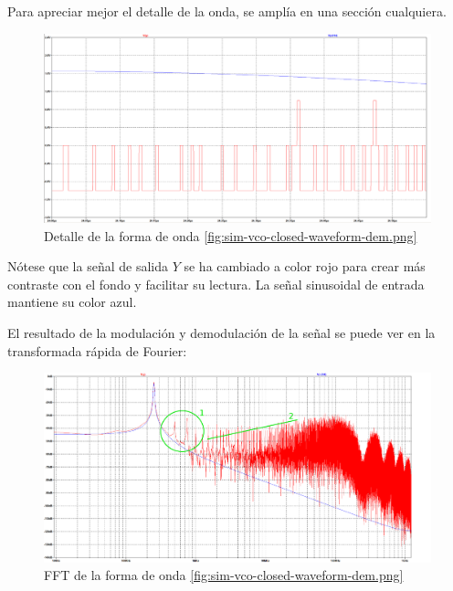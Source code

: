 \documentclass[12pt]{report} %
\begin{document}
	Para apreciar mejor el detalle de la onda, se amplía en una sección cualquiera.
	
	\begin{figure}[H]
		\includegraphics[width=\textwidth]{sim-vco-closed-waveform-dem-zoom.png}
		\caption[Detalle de la forma de onda \ref{fig:sim-vco-closed-waveform-dem.png}]{Detalle de la forma de onda \ref{fig:sim-vco-closed-waveform-dem.png}}
		\label{fig:sim-vco-closed-waveform-dem-zoom.png}
	\end{figure}

	Nótese que la señal de salida $Y$ se ha cambiado a color rojo para crear más contraste con el fondo y facilitar su lectura. La señal sinusoidal de entrada mantiene su color azul.
	
	El resultado de la modulación y demodulación de la señal se puede ver en la transformada rápida de Fourier:
	
	\begin{figure}[H]
		\includegraphics[width=\textwidth]{sim-vco-closed-waveform-dem-fft-annotated.png}
		\caption[FFT de la forma de onda \ref{fig:sim-vco-closed-waveform-dem.png}]{FFT de la forma de onda \ref{fig:sim-vco-closed-waveform-dem.png}}
		\label{fig:sim-vco-closed-waveform-dem-fft.png}
	\end{figure}
	
\end{document}
